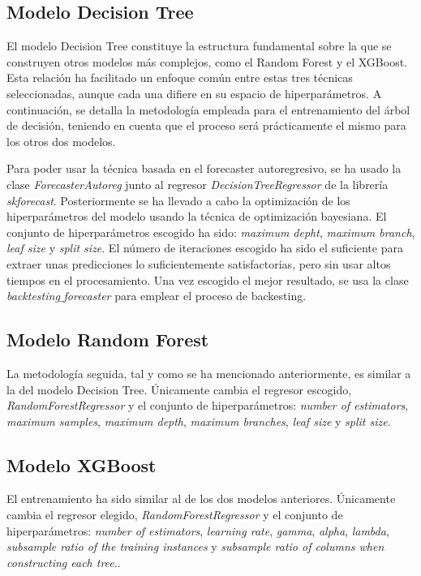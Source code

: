\documentclass[12pt,a4paper]{report}
\begin{document}
\subsection{Modelo Decision Tree}

El modelo Decision Tree constituye la estructura fundamental sobre la que se construyen otros modelos más complejos, como el Random Forest y el XGBoost. Esta relación ha facilitado un enfoque común entre estas tres técnicas seleccionadas, aunque cada una difiere en su espacio de hiperparámetros. A continuación, se detalla la metodología empleada para el entrenamiento del árbol de decisión, teniendo en cuenta que el proceso será prácticamente el mismo para los otros dos modelos. 

Para poder usar la técnica basada en el forecaster autoregresivo, se ha usado la clase \textit{ForecasterAutoreg} junto al regresor \textit{DecisionTreeRegressor} de la librería \textit{skforecast}. Posteriormente se ha llevado a cabo la optimización de los hiperparámetros del modelo usando la técnica de optimización bayesiana. El conjunto de hiperparámetros escogido ha sido: \textit{maximum depht}, \textit{maximum branch}, \textit{leaf size} y \textit{split size}. El número de iteraciones escogido ha sido el suficiente para extraer unas predicciones lo suficientemente satisfactorias, pero sin usar altos tiempos en el procesamiento. Una vez escogido el mejor resultado, se usa la clase \textit{backtesting$\_$forecaster} para emplear el proceso de backesting.

\subsection{Modelo Random Forest}

La metodología seguida, tal y como se ha mencionado anteriormente, es similar a la del modelo Decision Tree. Únicamente cambia el regresor escogido, \textit{RandomForestRegressor} y el conjunto de hiperparámetros: \textit{number of estimators}, \textit{maximum samples}, \textit{maximum depth}, \textit{maximum branches}, \textit{leaf size} y \textit{split size}. 

\subsection{Modelo XGBoost}

El entrenamiento ha sido similar al de los dos modelos anteriores. Únicamente cambia el regresor elegido, \textit{RandomForestRegressor} y el conjunto de hiperparámetros: \textit{number of estimators}, \textit{learning rate}, \textit{gamma}, \textit{alpha}, \textit{lambda}, \textit{subsample ratio of the training instances} y \textit{subsample ratio of columns when constructing each tree}.. 
\end{document}
